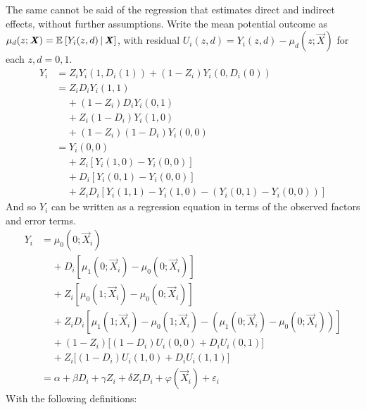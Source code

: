 The same cannot be said of the regression that estimates direct and indirect effects, without further assumptions.
Write the mean potential outcome as $\mu_{d}(z; \boldsymbol{\mathit{X}}) = \mathbb{E}_{} \left[ Y_i(z, d) \, \middle\vert \, \boldsymbol{\mathit{X}} \right]$, with residual $U_i(z,d) = Y_i(z, d) - \mu_{d}(z; \vec X)$ for each $z,d=0,1$.
\begin{align*}
    Y_i &= Z_i Y_i(1, D_i(1)) + (1 - Z_i) Y_i(0, D_i(0)) \\
        &= Z_i D_i Y_i(1, 1) \\
        & \;\;\;\; + (1 - Z_i) D_i Y_i(0, 1) \\
        & \;\;\;\; + Z_i (1 - D_i) Y_i(1, 0) \\
        & \;\;\;\; + (1 - Z_i) (1 - D_i) Y_i(0, 0) \\
        &= Y_i(0, 0) \\
        & \;\;\;\; + Z_i \left[Y_i(1, 0) - Y_i(0, 0) \right] \\
        & \;\;\;\; + D_i \left[Y_i(0, 1) - Y_i(0, 0) \right] \\
        & \;\;\;\; + Z_i D_i \left[Y_i(1, 1) - Y_i(1, 0)
            - \left( Y_i(0, 1) - Y_i(0, 0) \right)\right]
\end{align*}
And so $Y_i$ can be written as a regression equation in terms of the observed factors and error terms.
\begin{align*}
    Y_i &= \mu_0(0; \vec X_i) \\
        & \;\;\;\; + D_i \left[\mu_1(0; \vec X_i) - \mu_0(0; \vec X_i) \right] \\
        & \;\;\;\; + Z_i \left[\mu_0(1; \vec X_i) - \mu_0(0; \vec X_i) \right] \\
        & \;\;\;\; + Z_i D_i \left[\mu_1(1; \vec X_i) - \mu_0(1; \vec X_i)
            - \left( \mu_1(0; \vec X_i) - \mu_0(0; \vec X_i) \right)\right] \\
        & \;\;\;\; + (1-Z_i) \Big[
            \left( 1 - D_i \right) U_i(0, 0) + D_i U_i(0, 1) \Big] \\
        & \;\;\;\; + Z_i \Big[
            \left( 1 - D_i \right) U_i(1, 0) + D_i U_i(1, 1) \Big] \\
        &= \alpha + \beta D_i + \gamma Z_i + \delta Z_i D_i
            + \varphi(\vec X_i) + \varepsilon_i
\end{align*}
With the following definitions:

